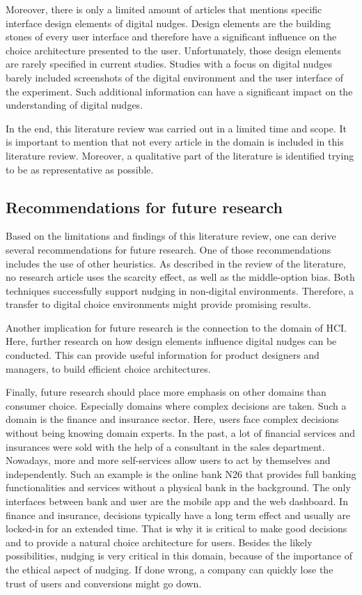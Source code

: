 Moreover, there is only a limited amount of articles that mentions specific interface design elements of digital nudges. Design elements are the building stones of every user interface and therefore have a significant influence on the choice architecture presented to the user. Unfortunately, those design elements are rarely specified in current studies. Studies with a focus on digital nudges barely included screenshots of the digital environment and the user interface of the experiment. Such additional information can have a significant impact on the understanding of digital nudges.

In the end, this literature review was carried out in a limited time and scope. It is important to mention that not every article in the domain is included in this literature review. Moreover, a qualitative part of the literature is identified trying to be as representative as possible.
 
 \subsection{Recommendations for future research}
 
 Based on the limitations and findings of this literature review, one can derive several recommendations for future research.
 One of those recommendations includes the use of other heuristics. As described in the review of the literature, no research article uses the scarcity effect, as well as the middle-option bias. Both techniques successfully support nudging in non-digital environments. Therefore, a transfer to digital choice environments might provide promising results.
 
 Another implication for future research is the connection to the domain of HCI. Here, further research on how design elements influence digital nudges can be conducted. This can provide useful information for product designers and managers, to build efficient choice architectures. 
 
 Finally, future research should place more emphasis on other domains than consumer choice. Especially domains where complex decisions are taken. Such a domain is the finance and insurance sector. Here, users face complex decisions without being knowing domain experts. In the past, a lot of financial services and insurances were sold with the help of a consultant in the sales department. Nowadays, more and more self-services allow users to act by themselves and independently. Such an example is the online bank N26 that provides full banking functionalities and services without a physical bank in the background. The only interfaces between bank and user are the mobile app and the web dashboard. In finance and insurance, decisions typically have a long term effect and usually are locked-in for an extended time. That is why it is critical to make good decisions and to provide a natural choice architecture for users. Besides the likely possibilities, nudging is very critical in this domain, because of the importance of the ethical aspect of nudging. If done wrong, a company can quickly lose the trust of users and conversions might go down. 